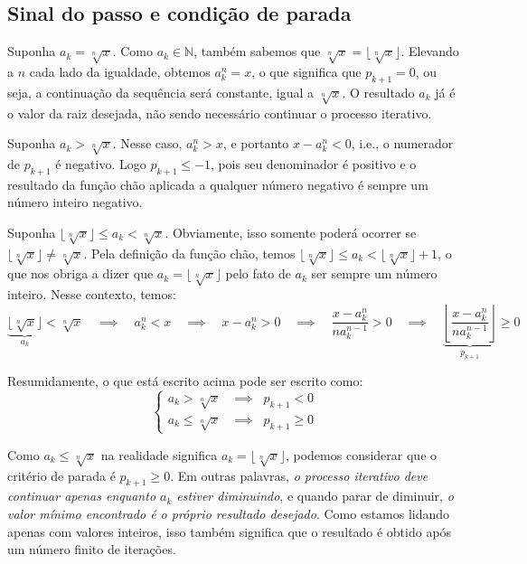 \subsection*{Sinal do passo e condição de parada}

Suponha $a_k = \sqrt[n]{x}$.
Como $a_k \in \mathds{N}$,
também sabemos que $\sqrt[n]{x} = \lfloor \sqrt[n]{x} \rfloor$.
Elevando a $n$ cada lado da igualdade, obtemos $a_k^n = x$,
o que significa que $p_{k+1} = 0$,
ou seja, a continuação da sequência será constante,
igual a $\sqrt[n]{x}$.
O resultado $a_k$ já é o valor da raiz desejada,
não sendo necessário continuar o processo iterativo.

Suponha $a_k > \sqrt[n]{x}$.
Nesse caso, $a_k^n > x$, e portanto $x - a_k^n < 0$,
i.e., o numerador de $p_{k+1}$ é negativo.
Logo $p_{k+1} \le -1$, pois seu denominador é positivo
e o resultado da função chão aplicada a qualquer número negativo
é sempre um número inteiro negativo.

Suponha $\lfloor \sqrt[n]{x} \rfloor \le a_k < \sqrt[n]{x}$.
Obviamente, isso somente poderá ocorrer
se $\lfloor \sqrt[n]{x} \rfloor \ne \sqrt[n]{x}$.
Pela definição da função chão, temos
$\lfloor\sqrt[n]{x}\rfloor \le a_k < \lfloor\sqrt[n]{x}\rfloor + 1$,
o que nos obriga a dizer que $a_k = \lfloor\sqrt[n]{x}\rfloor$
pelo fato de $a_k$ ser sempre um número inteiro.
Nesse contexto, temos:
\[
  \underbrace{\lfloor \sqrt[n]{x} \rfloor}_{a_k} < \sqrt[n]{x}
  \quad\implies\quad
  a_k^n < x
  \quad\implies\quad
  x - a_k^n > 0
  \quad\implies\quad
  \dfrac{x - a_k^n}{na_k^{n-1}} > 0
  \quad\implies\quad
  \underbrace{
    \left\lfloor \dfrac{x - a_k^n}{na_k^{n-1}} \right\rfloor
  }_{p_{k+1}} \ge 0
\]

Resumidamente, o que está escrito acima pode ser escrito como:
\[
\begin{cases}
  a_k > \sqrt[n]{x} &\implies\;\; p_{k+1} < 0 \\
  a_k \le \sqrt[n]{x} &\implies\;\; p_{k+1} \ge 0
\end{cases}
\]

Como $a_k \le \sqrt[n]{x}$ na realidade significa
$a_k = \lfloor \sqrt[n]{x} \rfloor$,
podemos considerar que o critério de parada é $p_{k+1} \ge 0$.
Em outras palavras,
\emph{o processo iterativo deve continuar
      apenas enquanto $a_k$ estiver diminuindo},
e quando parar de diminuir,
\emph{o valor mínimo encontrado é o próprio resultado desejado}.
Como estamos lidando apenas com valores inteiros,
isso também significa que o resultado é obtido
após um número finito de iterações.

